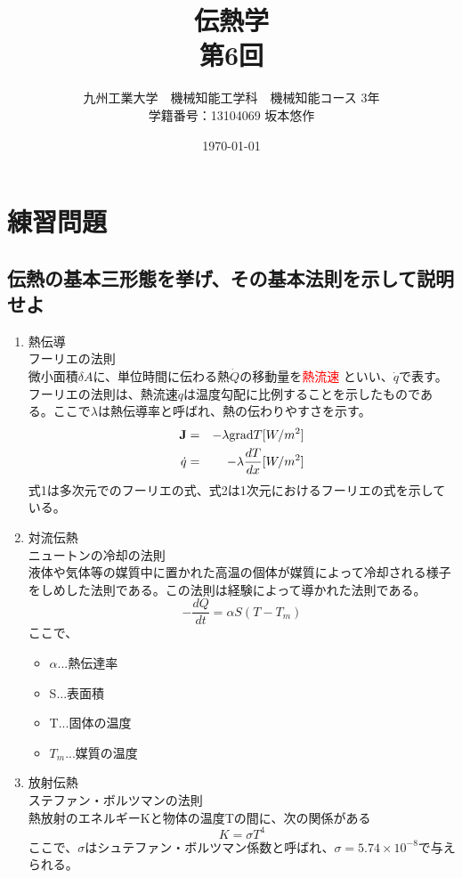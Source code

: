 \documentclass[a4j,twoside,openright,11pt]{jarticle}
\title{伝熱学\\第6回}
\author{九州工業大学　機械知能工学科　機械知能コース 3年\\学籍番号：13104069 坂本悠作}
\date{\today}
\begin{document}
\maketitle
\newpage

\section{練習問題}
\subsection{伝熱の基本三形態を挙げ、その基本法則を示して説明せよ}
\begin{enumerate}
\item 熱伝導\\
フーリエの法則\\
微小面積$\delta A$に、単位時間に伝わる熱$\dot Q$の移動量を\textcolor{red}{熱流速} といい、$\dot q$で表す。フーリエの法則は、熱流速$\dot q$は温度勾配に比例することを示したものである。ここで$\lambda$は熱伝導率と呼ばれ、熱の伝わりやすさを示す。
\begin{eqnarray}
{\bf J}&=& -\lambda \mathrm{grad} T  [W/m^2]\\
\dot q &=& -\lambda \frac{dT}{dx} [W/m^2]
\end{eqnarray}
式1は多次元でのフーリエの式、式2は1次元におけるフーリエの式を示している。
\item 対流伝熱\\
ニュートンの冷却の法則\\
液体や気体等の媒質中に置かれた高温の個体が媒質によって冷却される様子をしめした法則である。この法則は経験によって導かれた法則である。
\begin{equation}
-\frac{dQ}{dt}=\alpha S (T-T_m)
\end{equation}
ここで、
\begin{itemize}
\item $\alpha$...熱伝達率
\item S...表面積
\item T...固体の温度
\item $T_m$...媒質の温度
\end{itemize}
\item 放射伝熱\\
ステファン・ボルツマンの法則\\
熱放射のエネルギーKと物体の温度Tの間に、次の関係がある
\begin{equation}
K=\sigma T^4
\end{equation}
ここで、$\sigma$はシュテファン・ボルツマン係数と呼ばれ、$\sigma = 5.74 \times 10^{-8}$で与えられる。
\end{enumerate}
\end{document}
